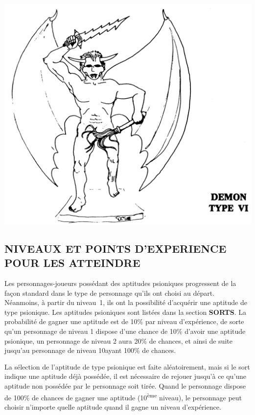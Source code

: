 \documentclass[11pt]{article}
\begin{document}
{\begin{center}
\includegraphics[scale=0.17]{./images/demon-typeVI.jpg}
\end{center}

\subsection*{\normalsize NIVEAUX ET POINTS D'EXPERIENCE POUR LES ATTEINDRE}

Les personnages-joueurs possédant des aptitudes psioniques progressent de la façon standard dans le type de personnage qu'ils ont choisi au départ. Néanmoins, à partir du niveau~1, ils ont la possibilité d'acquérir une aptitude de type psionique. Les aptitudes psioniques sont listées dans la section \textbf{SORTS}. La probabilité de gagner une aptitude est de 10\% par niveau d'expérience, de sorte qu'un personnage de niveau 1 dispose d'une chance de 10\% d'avoir une aptitude psionique, un personnage de niveau 2 aura 20\% de chances, et ainsi de suite jusqu'au personnage de niveau 10ayant 100\% de chances.

\bigskip

La sélection de l'aptitude de type psionique est faite aléatoirement, mais si le sort indique une aptitude déjà possédée, il est nécessaire de rejouer  jusqu'à ce qu'une aptitude non possédée par le personnage soit tirée. Quand le personnage dispose de 100\% de chances de gagner une aptitude (10\textsuperscript{ème} niveau), le personnage peut choisir n'importe quelle aptitude quand il gagne un niveau d'expérience.

}
\end{document}
